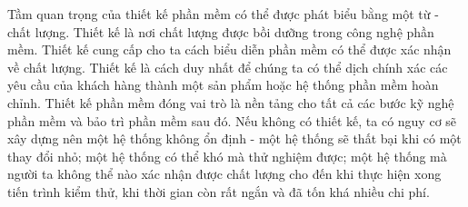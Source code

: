 \documentclass[./../SoftwareEngineering.tex]{subfiles}
\begin{document}
	
	Tầm quan trọng của thiết kế phần mềm có thể được phát biểu bằng một từ - chất lượng. Thiết kế là nơi chất lượng được bồi dưỡng trong công nghệ phần mềm. Thiết kế cung cấp cho ta cách biểu diễn phần mềm  có thể được xác nhận về chất lượng. Thiết kế là cách duy nhất để chúng ta có thể dịch chính xác các yêu cầu của khách hàng thành một sản phẩm hoặc hệ thống phần mềm hoàn chỉnh. Thiết kế phần mềm đóng vai trò là nền tảng cho tất cả các bước kỹ nghệ phần mềm và bảo trì phần mềm sau đó. Nếu không có thiết kế, ta có nguy cơ sẽ xây dựng nên một hệ thống không ổn định - một hệ thống sẽ thất bại khi có một thay đổi nhỏ; một hệ thống có thể khó mà thử nghiệm được; một hệ thống mà người ta không thể nào xác nhận được chất lượng cho đến khi thực hiện xong tiến trình kiểm thử, khi thời gian còn rất ngắn và đã tốn khá nhiều chi phí.

	
\end{document}
